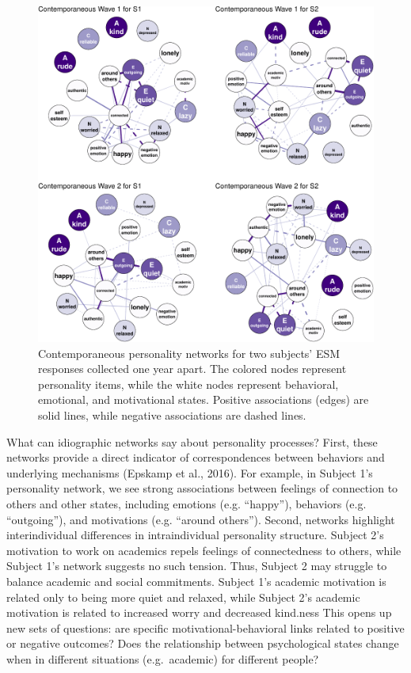 \documentclass[english,floatsintext,man]{apa6}
\theoremstyle{definition}
\theoremstyle{definition}
\theoremstyle{remark}
\begin{document}
\begin{figure}[htbp]
\centering
\includegraphics{BeckJacksonFinal_files/figure-latex/unnamed-chunk-4-1.pdf}
\caption{\label{fig:unnamed-chunk-4}Contemporaneous personality networks for
two subjects' ESM responses collected one year apart. The colored nodes
represent personality items, while the white nodes represent behavioral,
emotional, and motivational states. Positive associations (edges) are
solid lines, while negative associations are dashed lines.}
\end{figure}

What can idiographic networks say about personality processes? First,
these networks provide a direct indicator of correspondences between
behaviors and underlying mechanisms (Epskamp et al., 2016). For example,
in Subject 1's personality network, we see strong associations between
feelings of connection to others and other states, including emotions
(e.g. \enquote{happy}), behaviors (e.g. \enquote{outgoing}), and
motivations (e.g. \enquote{around others}). Second, networks highlight
interindividual differences in intraindividual personality structure.
Subject 2's motivation to work on academics repels feelings of
connectedness to others, while Subject 1's network suggests no such
tension. Thus, Subject 2 may struggle to balance academic and social
commitments. Subject 1's academic motivation is related only to being
more quiet and relaxed, while Subject 2's academic motivation is related
to increased worry and decreased kind.ness This opens up new sets of
questions: are specific motivational-behavioral links related to
positive or negative outcomes? Does the relationship between
psychological states change when in different situations (e.g.~academic)
for different people?
\end{document}
